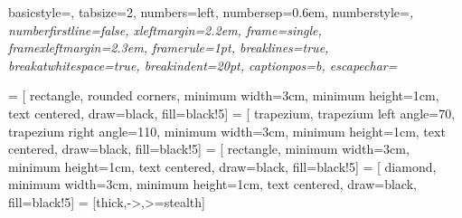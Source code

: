 
{
  basicstyle=\ttfamily\footnotesize,
  tabsize=2,
  numbers=left,
  numbersep=0.6em,      %
  numberstyle=\footnotesize\ttfamily\itshape,
  numberfirstline=false,
  xleftmargin=2.2em,    %
  frame=single,      %
  framexleftmargin=2.3em,  %
  framerule=1pt,
  breaklines=true,
  breakatwhitespace=true,
  breakindent=20pt,
  captionpos=b,
  escapechar=~
}

{
  \fancyhf{}  %
  \cfoot{\thepage}
  \renewcommand {\headrulewidth}{0pt}
  \renewcommand {\footrulewidth}{0pt}
}

 = [
  rectangle,
  rounded corners,
  minimum width=3cm, minimum height=1cm,
  text centered,
  draw=black,
  fill=black!5]
 = [
  trapezium,
  trapezium left angle=70,
  trapezium right angle=110,
  minimum width=3cm, minimum height=1cm,
  text centered,
  draw=black,
  fill=black!5]
 = [
  rectangle,
  minimum width=3cm, minimum height=1cm,
  text centered,
  draw=black,
  fill=black!5]
 = [
  diamond,
  minimum width=3cm, minimum height=1cm,
  text centered,
  draw=black,
  fill=black!5]
 = [thick,->,>=stealth]
